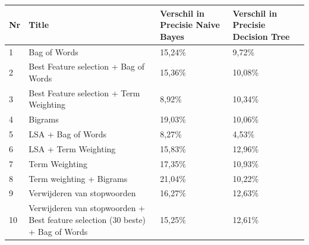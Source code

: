 \begin{table}[h]
\centering
\begin{adjustbox}{width=1\textwidth}
\begin{tabular}{|l|l|l|l|}
\hline
{\bf Nr} & {\bf Title}                                                                      & {\bf Verschil in Precisie Naive Bayes} & {\bf Verschil in Precisie Decision Tree} \\ \hline
1        & Bag of Words                                                                     & 15,24\%                                & 9,72\%                                   \\ \hline
2        & Best Feature selection + Bag of Words                                            & 15,36\%                                & 10,08\%                                  \\ \hline
3        & Best Feature selection + Term Weighting                                          & 8,92\%                                 & 10,34\%                                  \\ \hline
4        & Bigrams                                                                          & 19,03\%                                & 10,06\%                                  \\ \hline
5        & LSA + Bag of Words                                                               & 8,27\%                                 & 4,53\%                                   \\ \hline
6        & LSA + Term Weighting                                                             & 15,83\%                                & 12,96\%                                  \\ \hline
7        & Term Weighting                                                                   & 17,35\%                                & 10,93\%                                  \\ \hline
8        & Term weighting  + Bigrams                                                        & 21,04\%                                & 10,22\%                                  \\ \hline
9        & Verwijderen van stopwoorden                                                      & 16,27\%                                & 12,63\%                                  \\ \hline
10       & Verwijderen van stopwoorden + Best feature selection (30 beste) + Bag of Words   & 15,25\%                                & 12,61\%                                  \\ \hline

\end{tabular}
\end{adjustbox}
\end{table}
